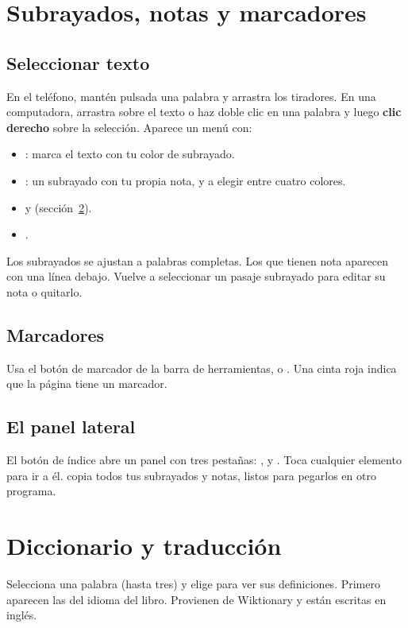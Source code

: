 \documentclass[11pt]{article}
\begin{document}
\section{Subrayados, notas y marcadores}

\subsection{Seleccionar texto}
En el teléfono, mantén pulsada una palabra y arrastra los tiradores. En una computadora, arrastra
sobre el texto o haz doble clic en una palabra y luego \textbf{clic derecho} sobre la selección.
Aparece un menú con:
\begin{itemize}
  \item {}: marca el texto con tu color de subrayado.
  \item {}: un subrayado con tu propia nota, y a elegir entre cuatro colores.
  \item {} y  (sección~\ref{sec:lookup}).
  \item {}.
\end{itemize}
Los subrayados se ajustan a palabras completas. Los que tienen nota aparecen con una línea debajo.
Vuelve a seleccionar un pasaje subrayado para editar su nota o quitarlo.

\subsection{Marcadores}
Usa el botón de marcador de la barra de herramientas, o . Una cinta roja indica que
la página tiene un marcador.

\subsection{El panel lateral}
El botón de índice abre un panel con tres pestañas: ,  y . Toca
cualquier elemento para ir a él.  copia todos tus subrayados y notas,
listos para pegarlos en otro programa.

\section{Diccionario y traducción}\label{sec:lookup}

Selecciona una palabra (hasta tres) y elige  para ver sus definiciones. Primero
aparecen las del idioma del libro. Provienen de Wiktionary y están escritas en inglés.
\end{document}
